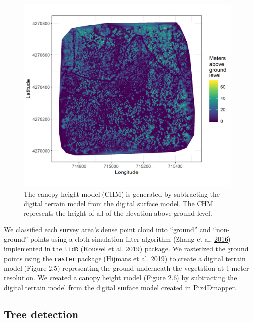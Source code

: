 \documentclass[twoside,12pt,final]{ucthesis-CA2012}
\begin{document}
\begin{ucmainmatter}
\begin{figure}
\centering
\includegraphics[width=6.00000in]{figure/chap02/eldo_3k_3_chm.png}
\caption{The canopy height model (CHM) is generated by subtracting the
digital terrain model from the digital surface model. The CHM represents
the height of all of the elevation above ground level.}
\end{figure}
We classified each survey area's dense point cloud into ``ground'' and
``non-ground'' points using a cloth simulation filter algorithm (Zhang
et al. \protect\hyperlink{ref-zhang2016}{2016}) implemented in the
\texttt{lidR} (Roussel et al. \protect\hyperlink{ref-roussel2019}{2019})
package. We rasterized the ground points using the \texttt{raster}
package (Hijmans et al. \protect\hyperlink{ref-hijmans2019}{2019}) to
create a digital terrain model (Figure 2.5) representing the ground
underneath the vegetation at 1 meter resolution. We created a canopy
height model (Figure 2.6) by subtracting the digital terrain model from
the digital surface model created in Pix4Dmapper.

\subsection{Tree detection}\label{tree-detection}


\end{ucmainmatter}
\end{document}
